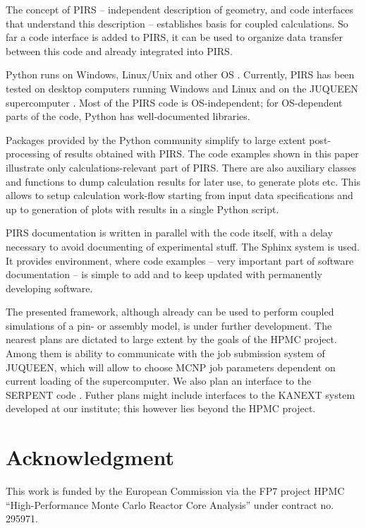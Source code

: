 \documentclass[a4paper,10pt,twocolumn,english]{sphinxsnamc2013}
\begin{document}
The concept of PIRS -- independent description of geometry, and code interfaces that understand this
description -- establishes basis for coupled calculations. So far a code interface is added to PIRS,
it can be used to organize data transfer between this code and already integrated into PIRS.

Python runs on Windows, Linux/Unix and other OS \cite{pythonWEB}. Currently, PIRS has been
tested on desktop computers running Windows and Linux and on the JUQUEEN
supercomputer \cite{juqueenWEB}. Most of the PIRS code is OS-independent;
for OS-dependent parts of the code, Python has well-documented libraries.

Packages provided by the Python community simplify to large extent
post-processing of results obtained with PIRS. The code examples shown in this
paper illustrate only calculations-relevant part of PIRS. There are also
auxiliary classes and functions to dump calculation results for later use, to
generate plots etc. This allows to setup calculation work-flow starting from
input data specifications and up to generation of plots with results in a single
Python script.

PIRS documentation is written in parallel with the code itself, with a delay
necessary to avoid documenting of experimental stuff. The Sphinx
\cite{sphinxWEB} system is used. It provides environment, where
code examples -- very important part of software documentation -- is simple to
add and to keep updated with permanently developing software.

The presented framework, although already can be used to perform coupled
simulations of a pin- or assembly model, is under further development. The
nearest plans are dictated to large extent by the goals of the HPMC project.
Among them is ability to communicate with the job submission system of JUQUEEN,
which will allow to choose MCNP job parameters dependent on current loading of
the supercomputer. We also plan an interface to the SERPENT code
\cite{serpentWEB}.  Futher plans might include interfaces to the
KANEXT \cite{kanext} system developed at our institute; this
however lies beyond the HPMC project.


\section{Acknowledgment}
\label{paper:acknowledgment}
This work is funded by the European Commission via the FP7 project HPMC
``High-Performance Monte Carlo Reactor Core Analysis'' under contract no. 295971.




\renewcommand{\indexname}{Index}
\end{document}
